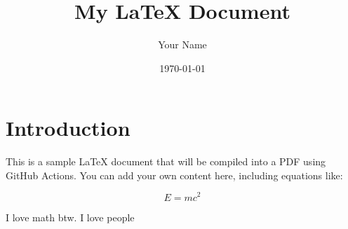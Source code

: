 \documentclass[a4paper,12pt]{article}
\begin{document}
\title{My LaTeX Document}
\author{Your Name}
\date{\today}
\maketitle

\section{Introduction}
This is a sample LaTeX document that will be compiled into a PDF using GitHub Actions. You can add your own content here, including equations like:

\begin{equation}
E = mc^2
\end{equation}

I love math btw. I love people

\end{document}
